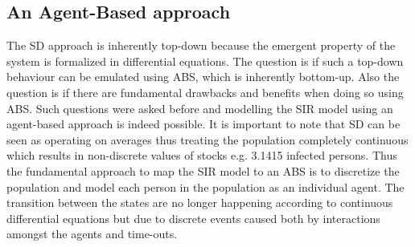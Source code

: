 \subsection*{An Agent-Based approach}
The SD approach is inherently top-down because the emergent property of the system is formalized in differential equations. The question is if such a top-down behaviour can be emulated using ABS, which is inherently bottom-up. Also the question is if there are fundamental drawbacks and benefits when doing so using ABS. Such questions were asked before and modelling the SIR model using an agent-based approach is indeed possible. It is important to note that SD can be seen as operating on averages thus treating the population completely continuous which results in non-discrete values of stocks e.g. 3.1415 infected persons. Thus the fundamental approach to map the SIR model to an ABS is to discretize the population and model each person in the population as an individual agent. The transition  between the states are no longer happening according to continuous differential equations but due to discrete events caused both by interactions amongst the agents and time-outs.

